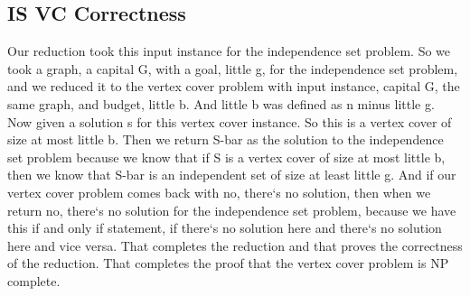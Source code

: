 \subsection{IS VC Correctness}
Our reduction took this input instance for the independence set problem.
So we took a graph, a capital G, with a goal, little g, for the independence set problem, and we reduced it to the vertex cover problem with input instance, capital G, the same graph, and budget, little b.
And little b was defined as n minus little g.
Now given a solution s for this vertex cover instance.
So this is a vertex cover of size at most little b.
Then we return S-bar as the solution to the independence set problem because we know that if S is a vertex cover of size at most little b, then we know that S-bar is an independent set of size at least little g.
And if our vertex cover problem comes back with no, there`s no solution, then when we return no, there`s no solution for the independence set problem, because we have this if and only if statement, if there`s no solution here and there`s no solution here and vice versa.
That completes the reduction and that proves the correctness of the reduction.
That completes the proof that the vertex cover problem is NP complete.

